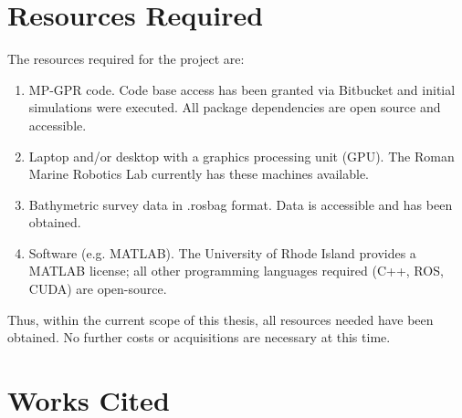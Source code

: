 \documentclass{article}
\begin{document}


\section{Resources Required}

The resources required for the project are:
\begin{enumerate}
    \item MP-GPR code. Code base access has been granted via Bitbucket and initial simulations were executed. All package dependencies are open source and accessible. 
    \item Laptop and/or desktop with a graphics processing unit (GPU). The Roman Marine Robotics Lab currently has these machines available.
    \item Bathymetric survey data in .rosbag format.  Data is accessible and has been obtained.
    \item Software (e.g. MATLAB). The University of Rhode Island provides a MATLAB license; all other programming languages required (C++, ROS, CUDA) are open-source.
\end{enumerate}

Thus, within the current scope of this thesis, all resources needed have been obtained. No further costs or acquisitions are necessary at this time.

\pagebreak


\section{Works Cited}

\nocite{*}
\printbibliography
\end{document}
